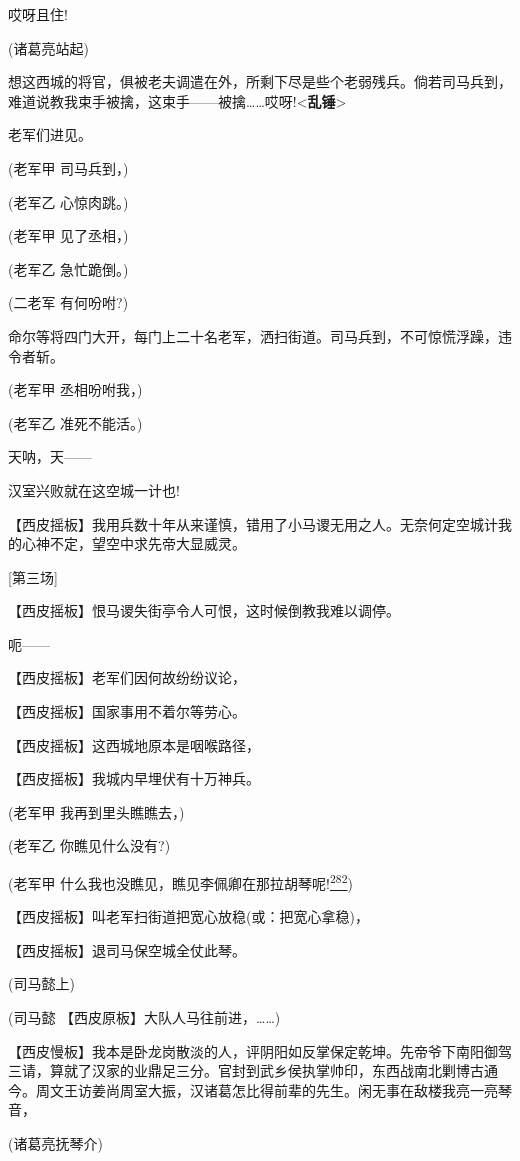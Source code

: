 哎呀且住!

(诸葛亮站起)

想这西城的将官，俱被老夫调遣在外，所剩下尽是些个老弱残兵。倘若司马兵到，难道说教我束手被擒，这束手------被擒\ldots{}\ldots{}哎呀!\textless{}\textbf{乱锤}\textgreater{}

老军们进见。

(老军甲 司马兵到，)

(老军乙 心惊肉跳。)

(老军甲 见了丞相，)

(老军乙 急忙跪倒。)

(二老军 有何吩咐?)

命尔等将四门大开，每门上二十名老军，洒扫街道。司马兵到，不可惊慌浮躁，违令者斩。

(老军甲 丞相吩咐我，)

(老军乙 准死不能活。)

天呐，天------

汉室兴败就在这空城一计也!

【西皮摇板】我用兵数十年从来谨慎，错用了小马谡无用之人。无奈何定空城计我的心神不定，望空中求先帝大显威灵。

{[}第三场{]}

【西皮摇板】恨马谡失街亭令人可恨，这时候倒教我难以调停。

呃------

【西皮摇板】老军们因何故纷纷议论，

【西皮摇板】国家事用不着尔等劳心。

【西皮摇板】这西城地原本是咽喉路径，

【西皮摇板】我城内早埋伏有十万神兵。

(老军甲 我再到里头瞧瞧去，)

(老军乙 你瞧见什么没有?)

(老军甲
什么我也没瞧见，瞧见李佩卿在那拉胡琴呢!\protect\hyperlink{fn282}{\textsuperscript{282}})

【西皮摇板】叫老军扫街道把宽心放稳(或：把宽心拿稳)，

【西皮摇板】退司马保空城全仗此琴。

(司马懿上)

(司马懿 【西皮原板】大队人马往前进，\ldots{}\ldots{})

【西皮慢板】我本是卧龙岗散淡的人，评阴阳如反掌保定乾坤。先帝爷下南阳御驾三请，算就了汉家的业鼎足三分。官封到武乡侯执掌帅印，东西战南北剿博古通今。周文王访姜尚周室大振，汉诸葛怎比得前辈的先生。闲无事在敌楼我亮一亮琴音，

(诸葛亮抚琴介)

